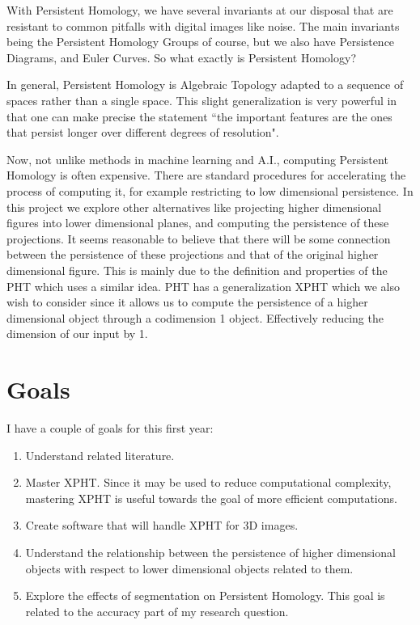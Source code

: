 \documentclass[12pt]{article}
\theoremstyle{theorem}
\theoremstyle{definition}
\theoremstyle{remark}
\theoremstyle{gremark}
\theoremstyle{discussion}
\theoremstyle{notation}
\begin{document}
	
		
		 With Persistent Homology, we have several invariants at our disposal that are resistant to common pitfalls with digital images like noise. The main invariants being the Persistent Homology Groups of course, but we also have Persistence Diagrams, and Euler Curves. So what exactly is Persistent Homology?
		 
		 In general, Persistent Homology is Algebraic Topology adapted to a sequence of spaces rather than a single space. This slight generalization is very powerful in that one can make precise the statement ``the important features are the ones that persist longer over different degrees of resolution". 
		 
		 Now, not unlike methods in machine learning and A.I., computing Persistent Homology is often expensive. There are standard procedures for accelerating the process of computing it, for example restricting to low dimensional persistence. In this project we explore other alternatives like projecting higher dimensional figures into lower dimensional planes, and computing the persistence of these projections. It seems reasonable to believe that there will be some connection between the persistence of these projections and that of the original higher dimensional figure. This is mainly due to the definition and properties of the PHT \cite{turner2014persistenthomologytransformmodeling} which uses a similar idea. PHT has a generalization XPHT \cite{turner_extended_2024} which we also wish to consider since it allows us to compute the persistence of a higher dimensional object through a codimension 1 object. Effectively reducing the dimension of our input by 1.
	
	
	\section*{Goals}
	
	I have a couple of goals for this first year:

		\begin{enumerate}
			\item Understand related literature.
			\item Master XPHT. Since it may be used to reduce computational complexity, mastering XPHT is useful towards the goal of more efficient computations.
			\item Create software that will handle XPHT for 3D images. 
			\item Understand the relationship between the persistence of higher dimensional objects with respect to lower dimensional objects related to them. 
			\item Explore the effects of segmentation on Persistent Homology. This goal is related to the accuracy part of my research question.
		\end{enumerate}
	
\end{document}
